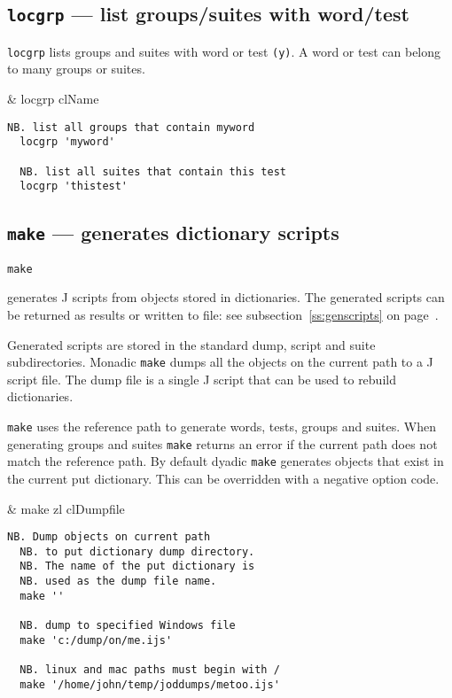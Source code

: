 \subsection{\texttt{locgrp} --- list groups/suites with word/test}\label{ss:locgrp}

\texttt{locgrp} lists groups and suites with word or test \texttt{(y)}.   
A word or test can belong to many groups or suites. 

\begin{wordhead}
\monad & locgrp clName \\
\end{wordhead} 
\begin{lstlisting}[frame=single,framerule=0pt]  
  NB. list all groups that contain myword
  locgrp 'myword' 

  NB. list all suites that contain this test
  locgrp 'thistest' 
\end{lstlisting}


\subsection{\texttt{make} --- generates dictionary scripts}\label{ss:make}

\hypertarget{il:make}{\texttt{make}} generates J 
scripts from objects stored
in dictionaries.
The generated scripts can be returned as results or written to file: 
see subsection~\ref{ss:genscripts} on page~\pageref{ss:genscripts}.

Generated scripts are stored in the standard dump, 
script and suite subdirectories.  Monadic \texttt{make} dumps all the objects 
on the current path to a J script file.  The dump file is a single J script 
that can be used to rebuild dictionaries. 

\texttt{make} uses the reference path to generate words, 
tests, groups and suites.
When generating groups and suites \texttt{make} returns an error if the current 
path does not match the reference path. By default dyadic \texttt{make} generates 
objects that exist in the current put dictionary. 
This can be overridden with a negative option code. 

\begin{wordhead}
\monad & make zl \argsep clDumpfile \\
\end{wordhead}
\begin{lstlisting}[frame=single,framerule=0pt] 
  NB. Dump objects on current path 
  NB. to put dictionary dump directory.
  NB. The name of the put dictionary is 
  NB. used as the dump file name.
  make '' 

  NB. dump to specified Windows file
  make 'c:/dump/on/me.ijs'
  
  NB. linux and mac paths must begin with /
  make '/home/john/temp/joddumps/metoo.ijs'
\end{lstlisting}

